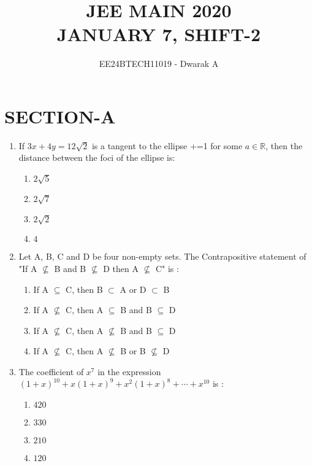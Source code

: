 \documentclass[journal,12pt,twocolumn]{IEEEtran}
\theoremstyle{remark}
\begin{document}

\vspace{3cm}

\title{\textbf{JEE MAIN 2020\\JANUARY 7, SHIFT-2}}
\author{EE24BTECH11019 - Dwarak A}
\maketitle
\newpage
\bigskip

\renewcommand{\thefigure}{\theenumi}
\renewcommand{\thetable}{\theenumi}

\section*{\textbf{SECTION-A}}
\bigskip

\begin{enumerate}

    \item If $3x+4y=12\sqrt{2}$ is a tangent to the ellipse +=1 for some $a\in\mathbb{R}$, then the distance between the foci of the ellipse is:
        \begin{enumerate}
            \item $2\sqrt{5}$
            \item $2\sqrt{7}$
            \item $2\sqrt{2}$
            \item $4$
        \end{enumerate}

    \item Let A, B, C and D be four non-empty sets. The Contrapositive statement of "If A $\nsubseteq$ B and B $\nsubseteq$ D then A $\nsubseteq$ C" is :
        \begin{enumerate}
            \item If A $\subseteq$ C, then B $\subset$ A or D $\subset$ B
            \item If A $\nsubseteq$ C, then A $\subseteq$ B and B $\subseteq$ D
            \item If A $\nsubseteq$ C, then A $\nsubseteq$ B and B $\subseteq$ D
            \item If A $\nsubseteq$ C, then A $\nsubseteq$ B or B $\nsubseteq$ D
        \end{enumerate}
    
    \item The coefficient of $x^7$ in the expression $(1 + x)^{10} + x(1 + x)^9 + x^2(1 + x)^8 +\cdots+x^{10}$ is :
        \begin{enumerate}
            \item $420$
            \item $330$
            \item $210$
            \item $120$
        \end{enumerate}


\end{enumerate}
\end{document}
